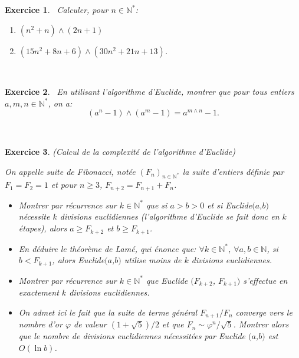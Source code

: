 \documentclass[11pt,a4paper]{article}
\newtheorem{ex}{Exercice}
\begin{document}
\begin{ex}\label{exPGCD_Polynomes}\
Calculer, pour $n \in \mathbb{N}^*$:
\begin{enumerate}
\item $ (n^2+n) \wedge (2n+1)$
\item $(15n^2+8n+6)\wedge (30 n^2+21n+13)$.
\end{enumerate}
\end{ex}
\







\begin{ex}\label{exPGCD_2n-1_2m-1}\
En utilisant l'algorithme d'Euclide, montrer que pour tous entiers $a,m,n \in \mathbb{N}^*$, on a: $$(a^n-1)\wedge(a^m-1)=a^{m\wedge n}-1.$$
\end{ex}

\


\begin{ex}\label{exComplexite_division_euclidienne}(Calcul de la complexité de l'algorithme d'Euclide)

On appelle suite de Fibonacci, notée $(F_n)_{n \in \mathbb{N}^*}$ la suite d'entiers définie par $F_1=F_2=1$ et pour $n\geqslant 3$, $F_{n+2}=F_{n+1}+F_n$. 
\begin{itemize}
\item[$1.$] Montrer par récurrence sur $k \in \mathbb{N}^*$ que si $a> b > 0$ et si Euclide$(a$,$b)$ nécessite $k$ divisions euclidiennes (l'algorithme d'Euclide se fait donc en $k$ étapes), alors $a \geq F_{k+2}$ et $b \geq F_{k+1}$.
\item[$2.$]En déduire le théorème de Lamé, qui énonce que: $\forall k \in \mathbb{N}^*$, $\forall a,b \in \mathbb{N}$, si $b<F_{k+1}$, alors Euclide$(a$,$b)$ utilise  moins de $k$ divisions euclidiennes.


\item[$3.$] Montrer par récurrence sur $k \in \mathbb{N}^*$ que Euclide $(F_{k+2}$, $F_{k+1})$ s'effectue en exactement $k$ divisions euclidiennes.


\item[$4.$] On admet ici le fait que la suite de terme général $F_{n+1}/F_n$ converge vers le nombre d'or $\varphi$ de valeur $(1+\sqrt{5})/2$ et que $F_n \sim \varphi^n/\sqrt{5}$. Montrer alors que le nombre de divisions euclidiennes nécessitées  par Euclide $(a$,$b)$ est $O(\ln b)$.
\end{itemize}
\end{ex}
\end{document}
